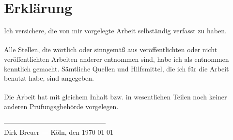 
\chapter*{Erklärung}\label{chap:erklaerung}

Ich versichere, die von mir vorgelegte Arbeit selbständig verfasst zu haben.\\ \\
Alle Stellen, die wörtlich oder sinngemäß aus veröffentlichten oder nicht veröffentlichten Arbeiten anderer entnommen sind, habe ich als entnommen kenntlich gemacht. Sämtliche Quellen und Hilfsmittel, die ich für die Arbeit benutzt habe, sind angegeben.\\ \\
Die Arbeit hat mit gleichem Inhalt bzw. in wesentlichen Teilen noch keiner anderen Prüfungsgbehörde vorgelegen.

\vspace{4cm}

\begin{flushright}
  ---------------------------------------------\\
  Dirk Breuer --- Köln, den \today
\end{flushright}
